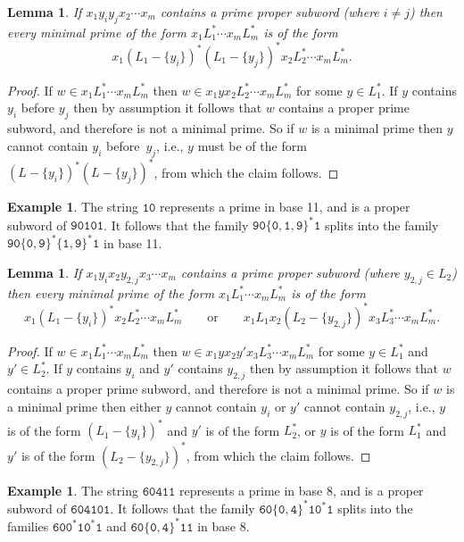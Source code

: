 \documentclass[12pt]{article}
\theoremstyle{plain}
\newtheorem{lemma}[theorem]{Lemma}
\theoremstyle{definition}
\newtheorem{example}[theorem]{Example}
\newcommand{\0}{\mathtt{0}}
\newcommand{\1}{\mathtt{1}}
\newcommand{\2}{\mathtt{2}}
\newcommand{\3}{\mathtt{3}}
\newcommand{\4}{\mathtt{4}}
\newcommand{\5}{\mathtt{5}}
\newcommand{\6}{\mathtt{6}}
\newcommand{\7}{\mathtt{7}}
\newcommand{\8}{\mathtt{8}}
\newcommand{\9}{\mathtt{9}}
\begin{document}
\begin{lemma}\label{lemsplit2b}
If\/ $x_1y_iy_jx_2\dotsm x_m$ contains a prime proper subword (where\/ $i\neq j$) then every minimal prime of the form\/
$x_1L_1^*\dotsm x_mL_m^*$ is of the form \[x_1(L_1-\{y_i\})^*(L_1-\{y_j\})^*x_2L_2^*\dotsm x_mL_m^* . \]
\end{lemma}
\begin{proof}
If $w\in x_1L_1^*\dotsm x_mL_m^*$ then $w\in x_1yx_2L_2^*\dotsm x_mL_m^*$ for some $y\in L_1^*$.
If $y$ contains $y_i$ before $y_j$ then by assumption it follows that $w$ contains a proper prime subword,
and therefore is not a minimal prime.  So if $w$ is a minimal prime then $y$ cannot contain $y_i$ before~$y_j$,
i.e., $y$ must be of the form $(L-\{y_i\})^*(L-\{y_j\})^*$, from which the claim follows.
\end{proof}
\begin{example}
The string $\1\0$ represents a prime in base 11, and is a proper subword of $\9\0\1\0\1$.
It follows that the family $\9\0\{\0,\1,\9\}^*\1$ splits into the family $\9\0\{\0,\9\}^*\{\1,\9\}^*\1$ in base 11.
\end{example}

\begin{lemma}\label{lemsplit2c}
If\/ $x_1y_ix_2y_{2,j}x_3\dotsm x_m$ contains a prime proper subword (where\/ $y_{2,j}\in L_2$) then every minimal prime of the form\/
$x_1L_1^*\dotsm x_mL_m^*$ is of the form
\[x_1(L_1-\{y_i\})^*x_2L_2^*\dotsm x_mL_m^* \qquad\text{or}\qquad x_1L_1x_2(L_2-\{y_{2,j}\})^*x_3L_3^*\dotsm x_mL_m^* . \]
\end{lemma}
\begin{proof}
If $w\in x_1L_1^*\dotsm x_mL_m^*$ then $w\in x_1yx_2y'x_3L_3^*\dotsm x_mL_m^*$ for some $y\in L_1^*$ and $y'\in L_2^*$.
If $y$ contains $y_i$ and $y'$ contains $y_{2,j}$ then by assumption it follows that $w$ contains a proper prime subword,
and therefore is not a minimal prime.  So if $w$ is a minimal prime then either $y$ cannot contain $y_i$ or $y'$ cannot
contain $y_{2,j}$, i.e., $y$ is of the form $(L_1-\{y_i\})^*$ and $y'$ is of the form $L_2^*$, or $y$ is of the form
$L_1^*$ and $y'$ is of the form $(L_2-\{y_{2,j}\})^*$, from which the claim follows.
\end{proof}
\begin{example}
The string $\6\0\4\1\1$ represents a prime in base 8, and is a proper subword of $\6\0\4\1\0\1$.
It follows that the family $\6\0\{\0,\4\}^*\1\0^*\1$ splits into the families
$\6\0\0^*\1\0^*\1$ and $\6\0\{\0,\4\}^*\1\1$ in base 8.
\end{example}
\end{document}
